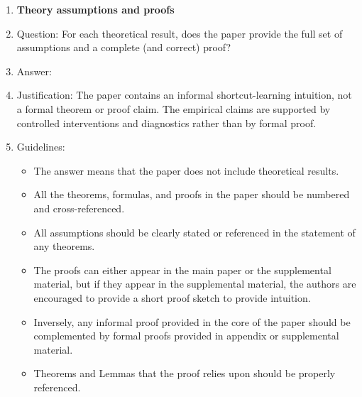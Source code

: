 \begin{enumerate}
\item {\bf Theory assumptions and proofs}
    \item[] Question: For each theoretical result, does the paper provide the full set of assumptions and a complete (and correct) proof?
    \item[] Answer: \answerNA{}
    \item[] Justification: The paper contains an informal shortcut-learning intuition, not a formal theorem or proof claim. The empirical claims are supported by controlled interventions and diagnostics rather than by formal proof.
    \item[] Guidelines:
    \begin{itemize}
        \item The answer \answerNA{} means that the paper does not include theoretical results. 
        \item All the theorems, formulas, and proofs in the paper should be numbered and cross-referenced.
        \item All assumptions should be clearly stated or referenced in the statement of any theorems.
        \item The proofs can either appear in the main paper or the supplemental material, but if they appear in the supplemental material, the authors are encouraged to provide a short proof sketch to provide intuition. 
        \item Inversely, any informal proof provided in the core of the paper should be complemented by formal proofs provided in appendix or supplemental material.
        \item Theorems and Lemmas that the proof relies upon should be properly referenced. 
    \end{itemize}


\end{enumerate}
